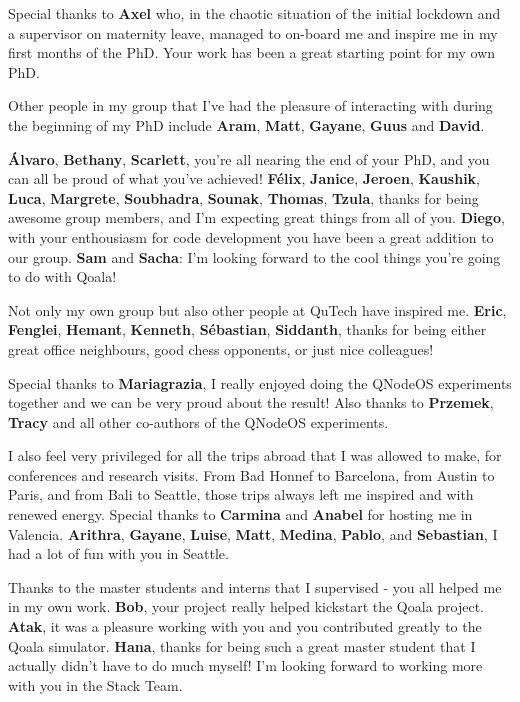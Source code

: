 Special thanks to \textbf{Axel} who, in the chaotic situation of the initial lockdown and a supervisor on maternity leave, managed to on-board me and inspire me in my first months of the PhD.
Your work has been a great starting point for my own PhD.

Other people in my group that I've had the pleasure of interacting with during the beginning of my PhD include
\textbf{Aram}, \textbf{Matt}, \textbf{Gayane}, \textbf{Guus} and \textbf{David}.

\textbf{\'Alvaro}, \textbf{Bethany}, \textbf{Scarlett}, you're all nearing the end of your PhD, and you can all be proud of what you've achieved!
\textbf{F\'elix}, \textbf{Janice}, \textbf{Jeroen}, \textbf{Kaushik}, \textbf{Luca}, \textbf{Margrete}, \textbf{Soubhadra}, \textbf{Sounak}, \textbf{Thomas}, \textbf{Tzula}, thanks for being awesome group members, and I'm expecting great things from all of you.
\textbf{Diego}, with your enthousiasm for code development you have been a great addition to our group.
\textbf{Sam} and \textbf{Sacha}: I'm looking forward to the cool things you're going to do with Qoala!

Not only my own group but also other people at QuTech have inspired me.
\textbf{Eric}, \textbf{Fenglei}, \textbf{Hemant}, \textbf{Kenneth}, \textbf{S\'ebastian}, \textbf{Siddanth}, thanks for being either great office neighbours, good chess opponents, or just nice colleagues!

Special thanks to \textbf{Mariagrazia}, I really enjoyed doing the QNodeOS experiments together and we can be very proud about the result!
Also thanks to \textbf{Przemek}, \textbf{Tracy} and all other co-authors of the QNodeOS experiments.

I also feel very privileged for all the trips abroad that I was allowed to make, for conferences and research visits.
From Bad Honnef to Barcelona, from Austin to Paris, and from Bali to Seattle, those trips always left me inspired and with renewed energy.
Special thanks to \textbf{Carmina} and \textbf{Anabel} for hosting me in Valencia.
\textbf{Arithra}, \textbf{Gayane}, \textbf{Luise}, \textbf{Matt}, \textbf{Medina}, \textbf{Pablo}, and \textbf{Sebastian}, I had a lot of fun with you in Seattle.

Thanks to the master students and interns that I supervised - you all helped me in my own work.
\textbf{Bob}, your project really helped kickstart the Qoala project.
\textbf{Atak}, it was a pleasure working with you and you contributed greatly to the Qoala simulator.
\textbf{Hana}, thanks for being such a great master student that I actually didn't have to do much myself!
I'm looking forward to working more with you in the Stack Team.

